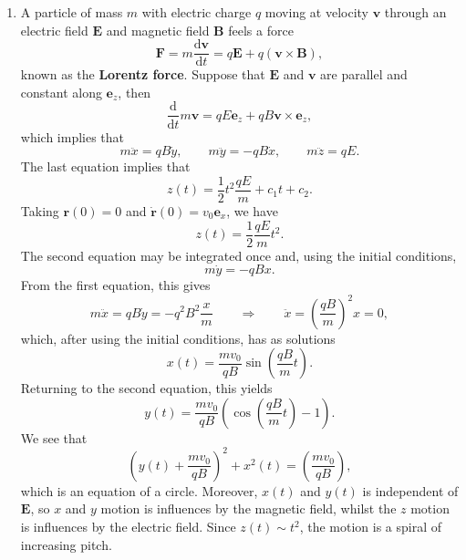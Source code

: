\documentclass[letter-paper]{tufte-book}
\newcommand{\Bb}{\boldsymbol{B}}
\newcommand{\eb}{\boldsymbol{e}}
\newcommand{\Eb}{\boldsymbol{E}}
\newcommand{\Fb}{\boldsymbol{F}}
\newcommand{\rb}{\boldsymbol{r}}
\newcommand{\vb}{\boldsymbol{v}}
\newcommand\Def[1]{\textbf{#1}}
\begin{document}
\begin{enumerate}
  \item A particle of mass $m$ with electric charge $q$ moving at velocity $\vb$
  through an electric field $\Eb$ and magnetic field $\Bb$ feels a force
  \begin{equation*}
    \Fb = m\frac{\mathrm{d}\vb}{\mathrm{d}t} = q\Eb + q(\vb\times\Bb),
  \end{equation*}
  known as the \Def{Lorentz force}. Suppose that $\Eb$ and $\vb$ are
  parallel and constant along $\eb_z$, then
  \begin{equation*}
    \frac{\mathrm{d}}{\mathrm{d}t} m\vb = qE\eb_z + qB\vb\times\eb_z,
  \end{equation*}
  which implies that
  \begin{equation*}
    m\ddot{x} = qB\dot{y},\qquad m\ddot{y} = -qB\dot{x},\qquad
    m\ddot{z} = qE.
  \end{equation*}
  The last equation implies that
  \begin{equation*}
    z(t) = \frac{1}{2}t^2 \frac{qE}{m} + c_1 t + c_2.
  \end{equation*}
  Taking $\rb(0) = 0$ and $\dot{\rb}(0) = v_0 \eb_x$, we have
  \begin{equation*}
    z(t) = \frac{1}{2}\frac{qE}{m} t^2.
  \end{equation*}
  The second equation may be integrated once and, using the initial conditions,
  \begin{equation*}
    m\dot{y} = -qBx.
  \end{equation*}
  From the first equation, this gives
  \begin{equation*}
    m\ddot{x} = qB\dot{y} = -q^2 B^2 \frac{x}{m} \qquad \Rightarrow \qquad
    \ddot{x} = \left(\frac{qB}{m}\right)^2 x = 0,
  \end{equation*}
  which, after using the initial conditions, has as solutions
  \begin{equation*}
    x(t) = \frac{m v_0}{qB} \sin\left(\frac{qB}{m} t\right).
  \end{equation*}
  Returning to the second equation, this yields
  \begin{equation*}
    y(t) = \frac{m v_0}{qB} \left(\cos\left(\frac{qB}{m} t\right) - 1\right).
  \end{equation*}
  We see that
  \begin{equation*}
    \left(y(t) + \frac{m v_0}{qB}\right)^2 + x^2(t) =
    \left(\frac{m v_0}{qB}\right),
  \end{equation*}
  which is an equation of a circle. Moreover, $x(t)$ and $y(t)$ is independent
  of $\Eb$, so $x$ and $y$ motion is influences by the magnetic field, whilst
  the $z$ motion is influences by the electric field. Since $z(t)\sim t^2$, the
  motion is a spiral of increasing pitch.
\end{enumerate}
\end{document}
